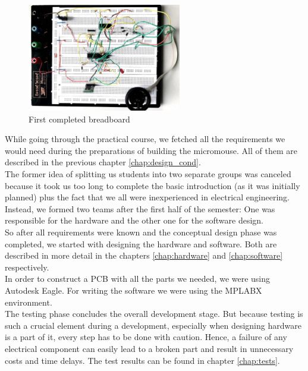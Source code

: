 \begin{figure}[H]
    \centering
    \includegraphics[width=0.6\textwidth]{figures/hardware/breadboard.jpeg}
    \caption{First completed breadboard}
    \label{fig:breadboard}
\end{figure}

\noindent
While going through the practical course, we fetched all the requirements we would need during the preparations of building the micromouse. All of them are described in the previous chapter \ref{chap:design_cond}.\\

\noindent
The former idea of splitting us students into two separate groups was canceled because it took us too long to complete the basic introduction (as it was initially planned) plus the fact that we all were inexperienced in electrical engineering. Instead, we formed two teams after the first half of the semester: One was responsible for the hardware and the other one for the software design.\\
So after all requirements were known and the conceptual design phase was completed, we started with designing the hardware and software. Both are described in more detail in the chapters \ref{chap:hardware} and \ref{chap:software} respectively. \\
In order to construct a PCB with all the parts we needed, we were using Autodesk Eagle. For writing the software we were using the MPLABX environment. \\

\noindent
The testing phase concludes the overall development stage. But because testing is such a crucial element during a development, especially when designing hardware is a part of it, every step has to be done with caution. Hence, a failure of any electrical component can easily lead to a broken part and result in unnecessary costs and time delays. The test results can be found in chapter \ref{chap:tests}.\\

